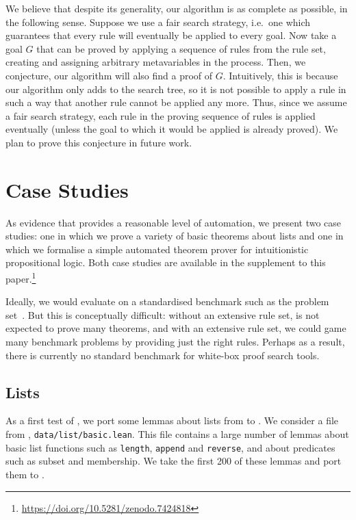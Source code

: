 We believe that despite its generality, our algorithm is as complete as
possible, in the following sense. Suppose we use a fair search strategy, i.e.\
one which guarantees that every rule will eventually be applied to every goal.
Now take a goal $G$ that can be proved by applying a sequence of rules from the
rule set, creating and assigning arbitrary metavariables in the process. Then,
we conjecture, our algorithm will also find a proof of $G$. Intuitively, this is
because our algorithm only adds to the search tree, so it is not possible to
apply a rule in such a way that another rule cannot be applied any more. Thus,
since we assume a fair search strategy, each rule in the proving sequence of
rules is applied eventually (unless the goal to which it would be applied is
already proved). We plan to prove this conjecture in future work.


\section{Case Studies}%
\label{sec:case-studies}

As evidence that \Aesop{} provides a reasonable level of automation, we present
two case studies: one in which we prove a variety of basic theorems about lists
and one in which we formalise a simple automated theorem prover for
intuitionistic propositional logic. Both case studies are available in the
supplement to this paper.\footnote{\url{https://doi.org/10.5281/zenodo.7424818}}

Ideally, we would evaluate \Aesop{} on a standardised benchmark such as the
\TPTP{} problem set~\cite{TPTP}. But this is conceptually difficult: without an
extensive rule set, \Aesop{} is not expected to prove many theorems, and with an
extensive rule set, we could game many benchmark problems by providing just the
right rules. Perhaps as a result, there is currently no standard benchmark for
white-box proof search tools.


\subsection{Lists}%
\label{sec:lists}

As a first test of \Aesop, we port some lemmas about lists from \Leanthree{} to
\Leanfour. We consider a file from \mathlib, \texttt{data/list/basic.lean}. This
file contains a large number of lemmas about basic list functions such as
\texttt{length}, \texttt{append} and \texttt{reverse}, and about predicates such
as subset and membership. We take the first 200 of these lemmas and port them to
\Leanfour.

